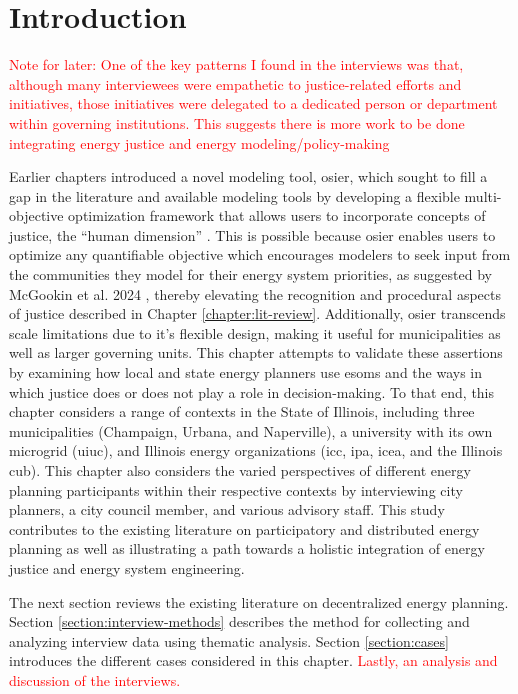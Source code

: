 \section{Introduction}

\textcolor{red}{Note for later: One of the key patterns I found in the interviews was
that, although many interviewees were empathetic to justice-related efforts and 
initiatives, those initiatives were delegated to a dedicated person or department
within governing institutions. This suggests there is more work to be done 
integrating energy justice and energy modeling/policy-making}

Earlier chapters introduced a novel modeling tool, \ac{osier}, which sought to
fill a gap in the literature and available modeling tools by developing a
flexible multi-objective optimization framework that allows users to incorporate
concepts of justice, the ``human dimension'' \cite{pfenninger_energy_2014}. This
is possible because \ac{osier} enables users to optimize any quantifiable
objective which encourages modelers to seek input from the communities they
model for their energy system priorities, as suggested by McGookin et al. 2024
\cite{mcgookin_advancing_2024}, thereby elevating the recognition and procedural
aspects of justice described in Chapter \ref{chapter:lit-review}. Additionally,
\ac{osier} transcends scale limitations due to it's flexible design, making it
useful for municipalities as well as larger governing units. This chapter
attempts to validate these assertions by examining how local and state energy
planners use \acp{esom} and the ways in which justice does or does not play a
role in decision-making. To that end, this chapter considers a range of contexts
in the State of Illinois, including three municipalities (Champaign, Urbana, and
Naperville), a university with its own microgrid (\acf{uiuc}), and Illinois
energy organizations (\acf{icc}, \acf{ipa}, \acf{icea}, and the Illinois
\acf{cub}). This chapter also considers the varied perspectives of different
energy planning participants within their respective contexts by interviewing
city planners, a city council member, and various advisory staff. This study
contributes to the existing literature on participatory and distributed energy
planning as well as illustrating a path towards a holistic integration of energy
justice and energy system engineering.

The next section reviews the existing literature on decentralized energy
planning. Section \ref{section:interview-methods} describes the method for
collecting and analyzing interview data using thematic analysis. Section
\ref{section:cases} introduces the different cases considered in this chapter.
\textcolor{red}{Lastly, an analysis and discussion of the interviews.}



